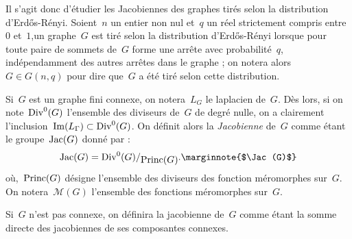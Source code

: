 \vspace*{0.3cm}
	Il s'agit donc d'étudier les Jacobiennes des graphes tirés selon la distribution d'Erd\H{o}s-Rényi. Soient~$n$ un entier non nul et~$q$ un réel strictement compris entre~$0$ et~$1$,un graphe~$G$ est tiré selon la distribution d'Erd\H{o}s-Rényi lorsque pour toute paire de sommets de~$G$ forme une arrête avec probabilité~$q$, indépendamment des autres arrêtes dans le graphe ; on notera alors~$G\in G(n,q)$ pour dire que~$G$ a été tiré selon cette distribution.
	
	Si~$G$ est un graphe fini connexe, on notera~$L_G$ le laplacien de~$G$. Dès lors, si on note~$\operatorname{Div}^0(G)$ l'ensemble des diviseurs de~$G$ de degré nulle, on a clairement l'inclusion~$\operatorname{Im}(L_\Gamma) \subset \operatorname{Div}^0(G)$. On définit alors la \emph{Jacobienne} de~$G$ comme étant le groupe~$\operatorname{Jac}(G)$ donné par :
	\[
		\Jac(G) = \quotient{\Div^0(G)}{\Princ(G)}.\text{\marginnote{$\Jac(G)$}}
	\]
	où,~$\operatorname{Princ}(G)$ désigne l'ensemble des diviseurs des fonction méromorphes sur~$G$. On notera~$\mathcal{M}(G)$ l'ensemble des fonctions méromorphes sur~$G$.
	
	 Si~$G$ n'est pas connexe, on définira la jacobienne de~$G$ comme étant la somme directe des jacobiennes de ses composantes connexes. 